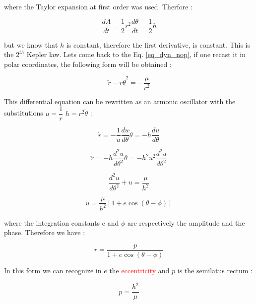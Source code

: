 \documentclass[12pt,%
               a4paper,%
               oneside,openany,%
               titlepage,%
               headinclude,footinclude,%
               BCOR5mm,%
               cleardoublepage=empty,%
               tablecaptionabove,%
               floatperchapter,
               ]{scrreprt}                 %
\begin{document}
where the Taylor expansion at first order was used. Therfore  \cite{murray1999solar}:

\begin{equation}
\dfrac{dA}{dt}=\dfrac{1}{2}r^{2}\dfrac{d\theta}{dt}=\dfrac{1}{2}h
\end{equation}

but we know that $h$ is constant, therefore the first derivative, is constant. This is the $2^{th}$ Kepler law. Lets come back to the Eq. \ref{eq_dyn_nop}, if one recast it in polar coordinates, the following form will be obtained \cite{murray1999solar}:

\begin{equation}
\ddot{r}-r\dot{\theta}^{2}=-\frac{\mu}{r^{2}}
\end{equation}

This differential equation can be rewritten as an armonic oscillator with the  substitutions $u=\dfrac{1}{r}$ $h=r^{2}\dot{\theta}$ \cite{murray1999solar}:

\begin{equation}
\dot{r}=-\frac{1}{u}\dfrac{du}{d\theta}\dot{\theta}=-h\frac{du}{d\theta}
\end{equation}

\begin{equation}
\ddot{r}=-h\dfrac{d^{2}u}{d\theta^{2}}\dot{\theta}=-h^{2}u^{2}\frac{d^{2}u}{d\theta^{2}}
\end{equation}

\begin{equation}
\dfrac{d^{2}u}{d\theta^{2}}+u=\frac{\mu}{h^{2}}
\end{equation}

\begin{equation}
u=\frac{\mu}{h^{2}}\left[1+e\cos(\theta-\phi)\right]
\end{equation}

where the integration constants e and $\phi$ are respectively the amplitude and the phase. Therefore we have \cite{murray1999solar}:

\begin{equation}
r=\dfrac{p}{1+e\cos(\theta-\phi)}
\end{equation}

In this form we can recognize in $e$ the \textcolor{red}{eccentricity} and $p$ is the semilatus rectum \cite{murray1999solar}:

\begin{equation}
p=\frac{h^{2}}{\mu}
\end{equation}
\end{document}
